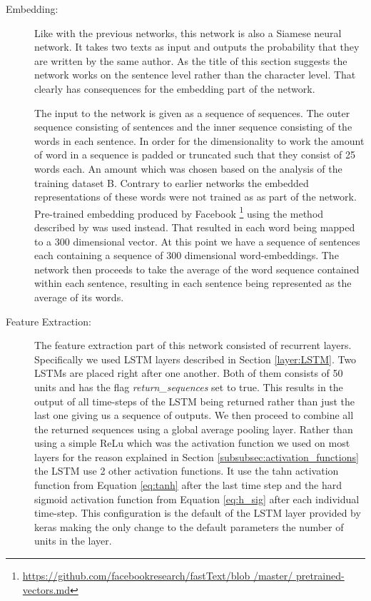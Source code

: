 \begin{description}

    \item[Embedding:]

        Like with the previous networks, this network is also a Siamese neural
        network. It takes two texts as input and outputs the probability that
        they are written by the same author. As the title of this section
        suggests the network works on the sentence level rather than the
        character level. That clearly has consequences for the embedding part of
        the network.

        The input to the network is given as a sequence of sequences. The outer
        sequence consisting of sentences and the inner sequence consisting
        of the words in each sentence. In order for the dimensionality to
        work the amount of word in a sequence is padded or truncated such
        that they consist of 25 words each. An amount which was chosen based
        on the analysis of the training dataset \gls{B}. Contrary to earlier
        networks the embedded representations of these words were not trained
        as as part of the network. Pre-trained embedding produced by Facebook
        \footnote{\url{https://github.com/facebookresearch/fastText/blob
        /master/ pretrained-vectors.md}} using the method described by
        \citet{bojanowski2016enriching} was used instead. That resulted in each
        word being mapped to a 300 dimensional vector. At this point we have
        a sequence of sentences each containing a sequence of 300 dimensional
        word-embeddings. The network then proceeds to take the average of the
        word sequence contained within each sentence, resulting in each sentence
        being represented as the average of its words.

    \item[Feature Extraction:]

        The feature extraction part of this network consisted of recurrent
        layers. Specifically we used \gls{LSTM} layers described in
        Section \ref{layer:LSTM}. Two \gls{LSTM}s are placed right after
        one another. Both of them consists of 50 units and has the flag
        \textit{return\_sequences} set to true. This results in the output
        of all time-steps of the \gls{LSTM} being returned rather than just
        the last one giving us a sequence of outputs. We then proceed to
        combine all the returned sequences using a global average pooling
        layer. Rather than using a simple \gls{ReLu} which was the activation
        function we used on most layers for the reason explained in Section
        \ref{subsubsec:activation_functions} the \gls{LSTM} use 2 other
        activation functions. It use the tahn activation function from Equation
        \eqref{eq:tanh} after the last time step and the hard sigmoid activation
        function from Equation \eqref{eq:h_sig} after each individual time-step.
        This configuration is the default of the \gls{LSTM} layer provided by
        keras making the only change to the default parameters the number of
        units in the layer.


\end{description}
